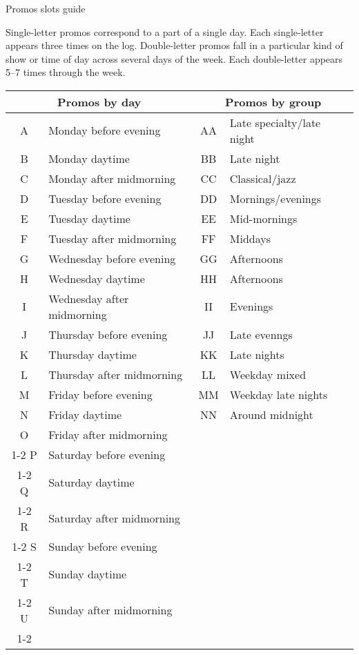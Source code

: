 \documentclass{article}
\begin{document}
\begin{center}
\Large Promos slots guide
\end{center}

Single-letter promos correspond to a part of a single day.  Each
single-letter appears three times on the log.  Double-letter promos
fall in a particular kind of show or time of day across several days
of the week.  Each double-letter appears 5--7 times through the week.

\begin{center}
\def\bothl#1#2#3{#1 & #2 & #1#1 & #3 \\ \hline}
\def\dayl#1#2{#1 & #2 \\ \cline{1-2}}
\begin{tabular}{|c|l||c|l|}
\hline \multicolumn{2}{|c||}{Promos by day} & \multicolumn{2}{c|}{Promos by group} \\ \hline\hline
\bothl A{Monday before evening}{Late specialty/late night}
\bothl B{Monday daytime}{Late night}
\bothl C{Monday after midmorning}{Classical/jazz}
\bothl D{Tuesday before evening}{Mornings/evenings}
\bothl E{Tuesday daytime}{Mid-mornings}
\bothl F{Tuesday after midmorning}{Middays}
\bothl G{Wednesday before evening}{Afternoons}
\bothl H{Wednesday daytime}{Afternoons}
\bothl I{Wednesday after midmorning}{Evenings}
\bothl J{Thursday before evening}{Late evenngs}
\bothl K{Thursday daytime}{Late nights}
\bothl L{Thursday after midmorning}{Weekday mixed}
\bothl M{Friday before evening}{Weekday late nights}
\bothl N{Friday daytime}{Around midnight}
\dayl  O{Friday after midmorning}
\dayl  P{Saturday before evening}
\dayl  Q{Saturday daytime}
\dayl  R{Saturday after midmorning}
\dayl  S{Sunday before evening}
\dayl  T{Sunday daytime}
\dayl  U{Sunday after midmorning}
\end{tabular}
\end{center}
\end{document}

